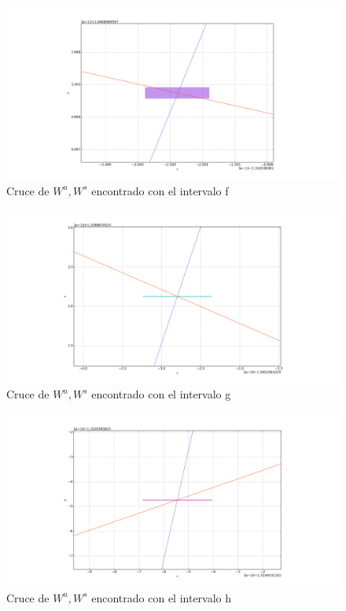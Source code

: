 \begin{figure}[H]
\centering
\includegraphics[scale=0.4]{cruce6}
\caption{Cruce de $W^{u},W^{s}$ encontrado con el intervalo f }
\label{cruce6H}
\end{figure}

\begin{figure}[H]
\centering
\includegraphics[scale=0.4]{cruce7}
\caption{Cruce de $W^{u},W^{s}$ encontrado con el intervalo g }
\label{cruce7H}
\end{figure}

\begin{figure}[H]
\centering
\includegraphics[scale=0.4]{cruce8}
\caption{Cruce de $W^{u},W^{s}$ encontrado con el intervalo h }
\label{cruce8H}
\end{figure}

